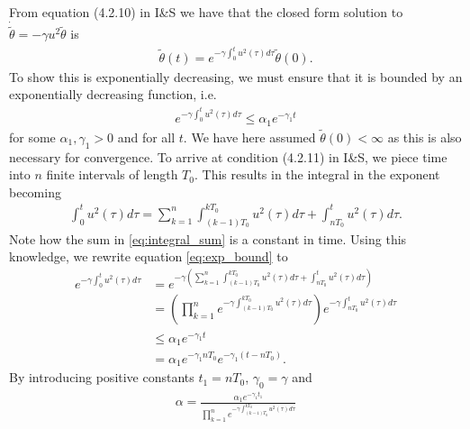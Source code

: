 \documentclass[]{article}
\begin{document}
\section{}
From equation (4.2.10) in I\&S we have that the closed form solution to $\dot{ \tilde \theta} = -\gamma u^2 \tilde \theta$ is
\begin{equation}\begin{aligned}
\tilde \theta (t) = e^{-\gamma \int^{t}_{0}u^2(\tau)d \tau}\tilde \theta(0).
\end{aligned}\end{equation}
To show this is exponentially decreasing, we must ensure that it is bounded by an exponentially decreasing function, i.e.
\begin{equation}\begin{aligned}
\label{eq:exp_bound}
e^{-\gamma \int^{t}_{0}u^2(\tau)d \tau} \leq \alpha_1 e^{-\gamma_1 t}
\end{aligned}\end{equation}
for some $\alpha_1, \gamma_1 > 0$ and for all $t$. We have here assumed $\tilde \theta(0) < \infty$ as this is also necessary for convergence. To arrive at condition (4.2.11) in I\&S, we piece time into $n$ finite intervals of length $T_0$. This results in the integral in the exponent becoming
\begin{equation}\begin{aligned}
\label{eq:integral_sum}
\int^{t}_{0}u^2(\tau)d \tau = \sum_{k=1}^{n}\int^{kT_0}_{(k-1)T_0}u^2(\tau)d \tau  + \int^{t}_{nT_0}u^2(\tau)d \tau.
\end{aligned}\end{equation}
Note how the sum in \eqref{eq:integral_sum} is a constant in time. Using this knowledge, we rewrite equation \eqref{eq:exp_bound} to
\begin{equation}\begin{aligned}
e^{-\gamma \int^{t}_{0}u^2(\tau)d \tau} &= e^{-\gamma (\sum_{k=1}^{n}\int^{kT_0}_{(k-1)T_0}u^2(\tau)d \tau  + \int^{t}_{nT_0}u^2(\tau)d \tau)} \\
&= (\prod_{k=1}^n e^{-\gamma\int^{kT_0}_{(k-1)T_0}u^2(\tau)d \tau  }) e^{-\gamma\int^{t}_{nT_0}u^2(\tau)d \tau} \\
&\leq \alpha_1 e^{-\gamma_1 t} \\
&= \alpha_1 e^{-\gamma_1 nT_0}e^{-\gamma_1 (t - nT_0)}.
\end{aligned}\end{equation}
By introducing positive constants $t_1 = nT_0$, $\gamma_0 = \gamma$ and
\begin{equation}\begin{aligned}
\alpha = \frac{\alpha_1 e^{-\gamma_1 t_1}}{\prod_{k=1}^n e^{-\gamma\int^{kT_0}_{(k-1)T_0}u^2(\tau)d \tau  }}
\end{aligned}\end{equation}
\end{document}
